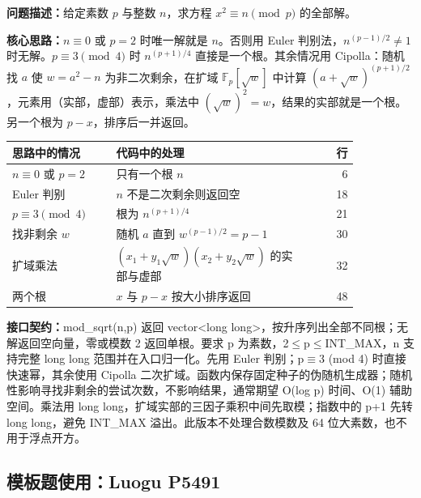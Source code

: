 \noindent\textbf{问题描述：}\allowbreak 给定素数 $p$ 与整数 $n$，求方程 $x^2\equiv n\pmod p$ 的全部解。

\textbf{核心思路：}\allowbreak $n\equiv0$ 或 $p=2$ 时唯一解就是 $n$。否则用 Euler 判别法，$n^{(p-1)/2}\ne1$ 时无解。$p\equiv3\pmod4$ 时 $n^{(p+1)/4}$ 直接是一个根。其余情况用 Cipolla：随机找 $a$ 使 $w=a^2-n$ 为非二次剩余，在扩域 $\mathbb{F}_p[\sqrt w]$ 中计算 $(a+\sqrt w)^{(p+1)/2}$，元素用（实部，虚部）表示，乘法中 $(\sqrt w)^2=w$，结果的实部就是一个根。另一个根为 $p-x$，排序后一并返回。

\begin{center}\small
\begin{tabular}{@{}p{0.30\linewidth}p{0.55\linewidth}r@{}}
\toprule
思路中的情况 & 代码中的处理 & 行\\
\midrule
$n\equiv0$ 或 $p=2$ & 只有一个根 $n$ & 6\\
Euler 判别 & $n$ 不是二次剩余则返回空 & 18\\
$p\equiv3\pmod4$ & 根为 $n^{(p+1)/4}$ & 21\\
找非剩余 $w$ & 随机 $a$ 直到 $w^{(p-1)/2}=p-1$ & 30\\
扩域乘法 & $(x_1+y_1\sqrt w)(x_2+y_2\sqrt w)$ 的实部与虚部 & 32\\
两个根 & $x$ 与 $p-x$ 按大小排序返回 & 48\\
\bottomrule
\end{tabular}
\end{center}



{\sloppy{}\noindent\textbf{接口契约：}mod\_sqrt(n,p) 返回 vector<long long>，按升序列出全部不同根；无解返回空向量，零或模数 2 返回单根。要求 p 为素数，2$\le$p$\le$INT\_MAX，n 支持完整 long long 范围并在入口归一化。先用 Euler 判别；p$\equiv$3 (mod 4) 时直接快速幂，其余使用 Cipolla 二次扩域。函数内保存固定种子的伪随机生成器；随机性影响寻找非剩余的尝试次数，不影响结果，通常期望 O(log p) 时间、O(1) 辅助空间。乘法用 long long，扩域实部的三因子乘积中间先取模；指数中的 p+1 先转 long long，避免 INT\_MAX 溢出。此版本不处理合数模数及 64 位大素数，也不用于浮点开方。\par}



\Needspace{395pt}

\subsection*{模板题使用：Luogu P5491}

